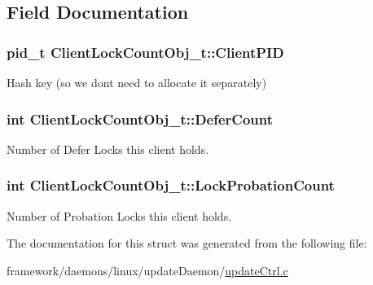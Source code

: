 \subsection{Field Documentation}
\subsubsection[{\texorpdfstring{Client\+P\+ID}{ClientPID}}]{\setlength{\rightskip}{0pt plus 5cm}pid\+\_\+t Client\+Lock\+Count\+Obj\+\_\+t\+::\+Client\+P\+ID}\hypertarget{struct_client_lock_count_obj__t_aa157190d7fb81981e28b66cbfc4f3235}{}\label{struct_client_lock_count_obj__t_aa157190d7fb81981e28b66cbfc4f3235}


Hash key (so we don\textquotesingle{}t need to allocate it separately) 

\subsubsection[{\texorpdfstring{Defer\+Count}{DeferCount}}]{\setlength{\rightskip}{0pt plus 5cm}int Client\+Lock\+Count\+Obj\+\_\+t\+::\+Defer\+Count}\hypertarget{struct_client_lock_count_obj__t_a4bb0dfb1ade079d3584297e9b185ef68}{}\label{struct_client_lock_count_obj__t_a4bb0dfb1ade079d3584297e9b185ef68}


Number of Defer Locks this client holds. 

\subsubsection[{\texorpdfstring{Lock\+Probation\+Count}{LockProbationCount}}]{\setlength{\rightskip}{0pt plus 5cm}int Client\+Lock\+Count\+Obj\+\_\+t\+::\+Lock\+Probation\+Count}\hypertarget{struct_client_lock_count_obj__t_a7feb37461ed7f0ebdf5a2a7dab02af1c}{}\label{struct_client_lock_count_obj__t_a7feb37461ed7f0ebdf5a2a7dab02af1c}


Number of Probation Locks this client holds. 



The documentation for this struct was generated from the following file\+:\begin{DoxyCompactItemize}
\item 
framework/daemons/linux/update\+Daemon/\hyperlink{update_ctrl_8c}{update\+Ctrl.\+c}\end{DoxyCompactItemize}
